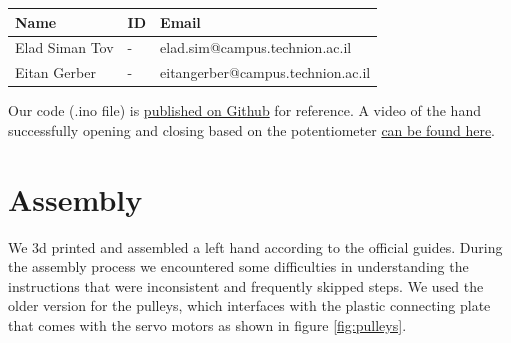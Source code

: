 \documentclass[10pt]{article}
\begin{document}
\begin{table}[h]
    \centering
    \begin{tabular}{l l l}
        \hline
        Name & ID & Email \\
        \hline
        Elad Siman Tov & - & elad.sim@campus.technion.ac.il \\
        \hline
        Eitan Gerber & - & eitangerber@campus.technion.ac.il \\
        \hline
    \end{tabular}
    \label{tab:personal_info}
\end{table}
\noindent Our code (.ino file) is \href{https://github.com/eladsimantov/Wearable-Robotics/blob/main/Final%20Project/Potentiometer_Servos.ino}{published on Github} for reference.
A video of the hand successfully opening and closing based on the potentiometer \href{https://technionmail-my.sharepoint.com/:v:/g/personal/eitangerber_campus_technion_ac_il/EebtvmOLvtBAnYd-IpQqAJ0BJ1s71PZn7ucrhZaetBrTBg?e=nfoBjf}{can be found here}.

\section*{Assembly}
We 3d printed and assembled a left hand according to the official guides.
During the assembly process we encountered some difficulties in understanding the instructions that were inconsistent and frequently skipped steps. We used the older version for the pulleys, which interfaces with the plastic connecting plate that comes with the servo motors as shown in figure \ref{fig:pulleys}.
\end{document}
